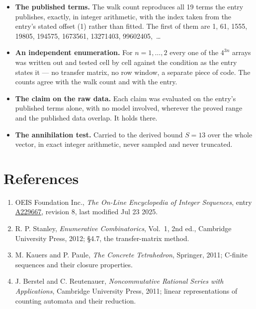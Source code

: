\documentclass[11pt]{article}
\theoremstyle{definition}
\begin{document}
\begin{itemize}

\item {\bfseries The published terms.} The walk count reproduces all 19 terms the entry publishes, exactly, in integer arithmetic, with the index taken from the entry's stated offset (1) rather than fitted. The first of them are 1, 61, 1555, 19805, 194575, 1673561, 13271403, 99602405,~\dots

\item {\bfseries An independent enumeration.} For $n = 1,\dots,2$ every one of the $4^{3n}$ arrays was written out and tested cell by cell against the condition as the entry states it --- no transfer matrix, no row window, a separate piece of code. The counts agree with the walk count and with the entry.

\item {\bfseries The claim on the raw data.} Each claim was evaluated on the entry's published terms alone, with no model involved, wherever the proved range and the published data overlap. It holds there.

\item {\bfseries The annihilation test.} Carried to the derived bound $S = 13$ over the whole vector, in exact integer arithmetic, never sampled and never truncated.

\end{itemize}

\section{References}

\begin{enumerate}

\item OEIS Foundation Inc., \emph{The On-Line Encyclopedia of Integer Sequences}, entry \href{https://oeis.org/A229667}{A229667}, revision 8, last modified Jul 23 2025.

\item R. P. Stanley, \emph{Enumerative Combinatorics}, Vol.~1, 2nd ed., Cambridge University Press, 2012; \S4.7, the transfer-matrix method.

\item M. Kauers and P. Paule, \emph{The Concrete Tetrahedron}, Springer, 2011; C-finite sequences and their closure properties.

\item J. Berstel and C. Reutenauer, \emph{Noncommutative Rational Series with Applications}, Cambridge University Press, 2011; linear representations of counting automata and their reduction.

\end{enumerate}
\end{document}
